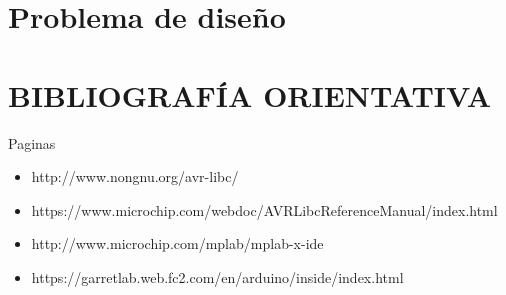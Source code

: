 \documentclass[10pt,conference,a4paper,onecolumn]{article}%
\begin{document}
\section{Problema de diseño}

\section{BIBLIOGRAFÍA ORIENTATIVA}

Paginas
\begin{itemize}
\item http://www.nongnu.org/avr-libc/
\item https://www.microchip.com/webdoc/AVRLibcReferenceManual/index.html
\item http://www.microchip.com/mplab/mplab-x-ide
\item https://garretlab.web.fc2.com/en/arduino/inside/index.html
\end{itemize}



%

%
\end{document}
